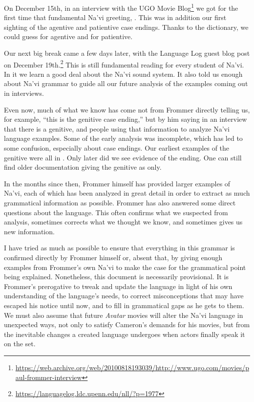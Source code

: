 On December 15th, in an interview with the UGO Movie
Blog\footnote{\url{https://web.archive.org/web/20100818193039/http://www.ugo.com/movies/paul-frommer-interview}}
we got for the first time that fundamental Na'vi greeting,  .  This was in addition our first
sighting of the agentive and patientive case endings.  Thanks to the
dictionary, we could guess  for agentive and  for
patientive.

Our next big break came a few days later, with the Language Log guest
blog post on December
19th.\footnote{\url{https://languagelog.ldc.upenn.edu/nll/?p=1977}}
This is still fundamental reading for every student of Na'vi.  In it
we learn a good deal about the Na'vi sound system.  It also told us
enough about Na'vi grammar to guide all our future analysis of
the examples coming out in interviews.

Even now, much of what we know has come not from Frommer directly
telling us, for example, ``this is the genitive case ending,'' but by
him saying in an interview that there is a genitive, and people using
that information to analyze Na'vi language examples.  Some of the
early analysis was incomplete, which has led to some confusion,
especially about case endings.  Our earliest examples of the genitive
were all in .  Only later did we see evidence of the 
ending.  One can still find older documentation giving the genitive as
 only.

In the months since then, Frommer himself has provided larger examples
of Na'vi, each of which has been analyzed in great detail in order to
extract as much grammatical information as possible.  Frommer has also
answered some direct questions about the language.  This often
confirms what we suspected from analysis, sometimes corrects what we
thought we know, and sometimes gives us new information.

I have tried as much as possible to ensure that everything in this
grammar is confirmed directly by Frommer himself or, absent that, by
giving enough examples from Frommer's own Na'vi to make the case for
the grammatical point being explained.  Nonetheless, this document is
necessarily provisional.  It is Frommer's prerogative to tweak and
update the language in light of his own understanding of the
language's needs, to correct misconceptions that may have escaped his
notice until now, and to fill in grammatical gaps as he gets to them.
We must also assume that future \textit{Avatar} movies will alter the
Na'vi language in unexpected ways, not only to satisfy Cameron's
demands for his movies, but from the inevitable changes a created
language undergoes when actors finally speak it on the set.


